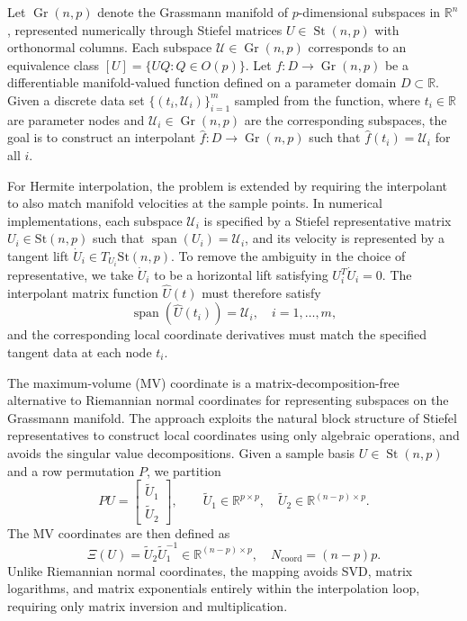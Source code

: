 \documentclass[11pt]{article}
\DeclareMathOperator{\Gr}{Gr}
\DeclareMathOperator{\St}{St}
\begin{document}
Let $\Gr(n,p)$ denote the Grassmann manifold of $p$-dimensional subspaces in $\mathbb{R}^n$, represented numerically through Stiefel matrices $U\in\St(n,p)$ with orthonormal columns. Each subspace $\mathcal{U} \in \Gr(n,p)$ corresponds to an equivalence class $[U] = \{UQ : Q \in O(p)\}$. Let $f: D \rightarrow \Gr(n, p)$ be a differentiable manifold-valued function defined on a parameter domain $D \subset \mathbb{R}$. Given a discrete data set $\{(t_i, \mathcal{U}_i)\}_{i=1}^m$ sampled from the function, where $t_i \in \mathbb{R}$ are parameter nodes and $\mathcal{U}_i \in \Gr(n, p)$ are the corresponding subspaces, the goal is to construct an interpolant $\hat{f}: D \rightarrow \Gr(n, p)$ such that $\hat{f}(t_i) = \mathcal{U}_i$ for all $i$.


For Hermite interpolation, the problem is extended by requiring the interpolant to also match manifold velocities at the sample points. In numerical implementations, each subspace $\mathcal{U}_i$ is specified by a Stiefel representative matrix $U_i \in \mathrm{St}(n,p)$ such that $\operatorname{span}(U_i)=\mathcal{U}_i$, and its velocity is represented by a tangent lift $\dot{U}_i \in T_{U_i}\mathrm{St}(n,p)$. To remove the ambiguity in the choice of representative, we take $\dot{U}_i$ to be a horizontal lift satisfying $U_i^T \dot{U}_i = 0$. The interpolant matrix function $\hat{U}(t)$ must therefore satisfy
\begin{equation*}
    \operatorname{span}(\hat{U}(t_i)) = \mathcal{U}_i, \quad i = 1, \dots, m,
\end{equation*}
and the corresponding local coordinate derivatives must match the specified tangent data at each node $t_i$.



The maximum-volume (MV) coordinate  \cite{jensen2024maximum} is a matrix-decomposition-free alternative to Riemannian normal coordinates for representing subspaces on the Grassmann manifold. The approach exploits the natural block structure of Stiefel representatives to construct local coordinates using only algebraic operations, and avoids the singular value decompositions. Given a sample basis $U\in\St(n,p)$ and a row permutation $P$, we partition
 $$
PU=\begin{bmatrix}\widetilde U_1\\ \widetilde U_2\end{bmatrix},
\qquad \widetilde U_1\in\mathbb{R}^{p\times p},\quad \widetilde U_2\in\mathbb{R}^{(n-p)\times p}.
 $$
The MV coordinates are then defined as
\begin{equation} \label{eq:mvcoord}
\Xi(U)=\widetilde U_2\widetilde U_1^{-1}\in\mathbb{R}^{(n-p)\times p},\quad N_{\text{coord}} = (n-p)p.
\end{equation}
Unlike Riemannian normal coordinates, the mapping avoids SVD, matrix logarithms, and matrix exponentials entirely within the interpolation loop, requiring only matrix inversion and multiplication.
\end{document}
